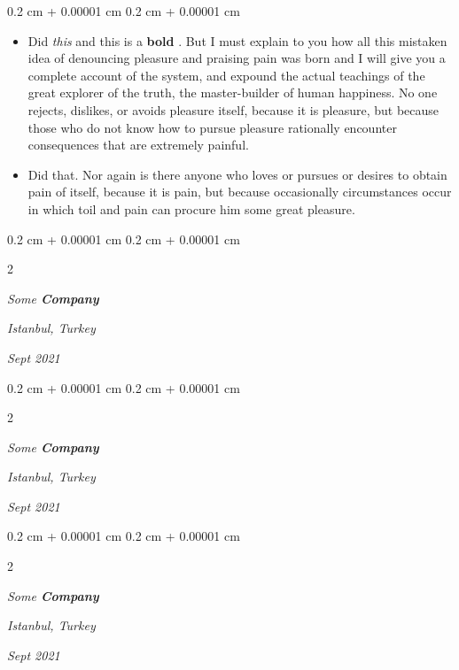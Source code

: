 \documentclass[10pt, letterpaper]{article}
\newenvironment{highlights}{
    \begin{itemize}[
        topsep=0.10 cm,
        parsep=0.10 cm,
        partopsep=0pt,
        itemsep=0pt,
        leftmargin=0.4 cm + 10pt
    ]
}{
    \end{itemize}
} %
\newenvironment{onecolentry}{
    \begin{adjustwidth}{
        0.2 cm + 0.00001 cm
    }{
        0.2 cm + 0.00001 cm
    }
}{
    \end{adjustwidth}
} %
\newenvironment{twocolentry}[2][]{
    \onecolentry
    \def\secondColumn{#2}
    \setcolumnwidth{\fill, 4.5 cm}
    \begin{paracol}{2}
}{
    \switchcolumn \raggedleft \secondColumn
    \end{paracol}
    \endonecolentry
} %
\let\hrefWithoutArrow\href
\renewcommand{\href}[2]{\hrefWithoutArrow{#1}{\ifthenelse{\equal{#2}{}}{ }{#2 }\raisebox{.15ex}{\footnotesize \faExternalLink*}}}
\begin{document}
        \vspace{0.10 cm}
        \begin{onecolentry}
            \begin{highlights}
                \item Did \textit{this} and this is a \textbf{bold} \href{https://example.com}{link}. But I must explain to you how all this mistaken idea of denouncing pleasure and praising pain was born and I will give you a complete account of the system, and expound the actual teachings of the great explorer of the truth, the master-builder of human happiness. No one rejects, dislikes, or avoids pleasure itself, because it is pleasure, but because those who do not know how to pursue pleasure rationally encounter consequences that are extremely painful.
                \item Did that. Nor again is there anyone who loves or pursues or desires to obtain pain of itself, because it is pain, but because occasionally circumstances occur in which toil and pain can procure him some great pleasure.
            \end{highlights}
        \end{onecolentry}


        \vspace{0.2 cm}

            \begin{twocolentry}{
        \textit{Istanbul, Turkey}

        \textit{Sept 2021}    }
                \textbf{}

                \textit{Some \textbf{Company}}
            \end{twocolentry}



        \vspace{0.2 cm}

            \begin{twocolentry}{
        \textit{Istanbul, Turkey}

        \textit{Sept 2021}    }
                \textbf{}

                \textit{Some \textbf{Company}}
            \end{twocolentry}



        \vspace{0.2 cm}

            \begin{twocolentry}{
        \textit{Istanbul, Turkey}

        \textit{Sept 2021}    }
                \textbf{}

                \textit{Some \textbf{Company}}
            \end{twocolentry}
\end{document}
